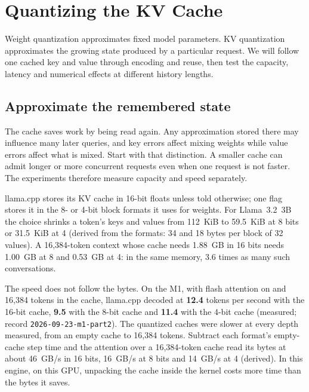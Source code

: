 \chapter{Quantizing the KV Cache}\label{ch:kv-quantization}

\begin{ChapterIntent}
Weight quantization approximates fixed model parameters. KV quantization approximates
the growing state produced by a particular request. We will follow one cached key and
value through encoding and reuse, then test the capacity, latency and numerical effects
at different history lengths.
\end{ChapterIntent}

\section*{Approximate the remembered state}
The cache saves work by being read again. Any approximation stored there may influence
many later queries, and key errors affect mixing weights while value errors affect what
is mixed. Start with that distinction. A smaller cache can admit longer or more
concurrent requests even when one request is not faster. The experiments therefore
measure capacity and speed separately.


llama.cpp stores its KV cache in 16-bit floats unless told otherwise; one
flag stores it in the 8- or 4-bit block formats it uses for weights. For
Llama~3.2~3B the choice shrinks a token's keys and values from 112~KiB to
59.5~KiB at 8 bits or 31.5~KiB at 4 (derived from the formats: 34 and 18 bytes
per block of 32 values). A 16,384-token context whose cache needs 1.88~GB in
16 bits needs 1.00~GB at 8 and 0.53~GB at 4: in the same memory, 3.6 times as
many such conversations.

The speed does not follow the bytes. On the M1, with flash attention on and
16,384 tokens in the cache, llama.cpp decoded at \textbf{12.4} tokens per second
with the 16-bit cache, \textbf{9.5} with the 8-bit cache and \textbf{11.4} with
the 4-bit cache (measured; record \texttt{2026-09-23-m1-part2}). The quantized
caches were slower at every depth measured, from an empty cache to 16,384
tokens. Subtract each format's empty-cache step time and the attention over a
16,384-token cache read its bytes at about 46~GB/s in 16 bits, 16~GB/s at 8
bits and 14~GB/s at 4 (derived). In this engine, on this GPU, unpacking the
cache inside the kernel costs more time than the bytes it saves.

